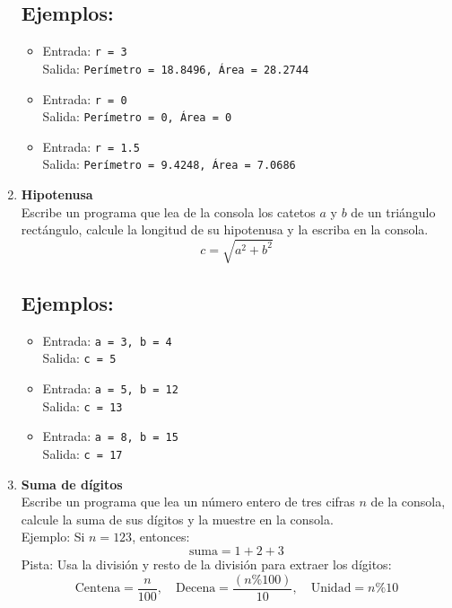 \begin{enumerate}
    \subsection*{Ejemplos:}
    \begin{itemize}
        \item Entrada: \texttt{r = 3}\\
              Salida: \texttt{Perímetro = 18.8496, Área = 28.2744}
        \item Entrada: \texttt{r = 0}\\
              Salida: \texttt{Perímetro = 0, Área = 0}
        \item Entrada: \texttt{r = 1.5}\\
              Salida: \texttt{Perímetro = 9.4248, Área = 7.0686}
    \end{itemize}

    \item \textbf{Hipotenusa}\\
    Escribe un programa que lea de la consola los catetos \(a\) y \(b\) de un triángulo rectángulo, calcule la longitud de su hipotenusa y la escriba en la consola.\\
    \[
    c = \sqrt{a^2 + b^2}
    \]
    \subsection*{Ejemplos:}
    \begin{itemize}
        \item Entrada: \texttt{a = 3, b = 4}\\
              Salida: \texttt{c = 5}
        \item Entrada: \texttt{a = 5, b = 12}\\
              Salida: \texttt{c = 13}
        \item Entrada: \texttt{a = 8, b = 15}\\
              Salida: \texttt{c = 17}
    \end{itemize}

    \item \textbf{Suma de dígitos}\\
    Escribe un programa que lea un número entero de tres cifras \(n\) de la consola, calcule la suma de sus dígitos y la muestre en la consola.\\
    Ejemplo: Si \(n = 123\), entonces:
    \[
    \text{suma} = 1 + 2 + 3
    \]
    Pista: Usa la división y resto de la división para extraer los dígitos:
    \[
    \text{Centena} = \frac{n}{100}, \quad \text{Decena} = \frac{(n \% 100)}{10}, \quad \text{Unidad} = n \% 10
    \]

\end{enumerate}
